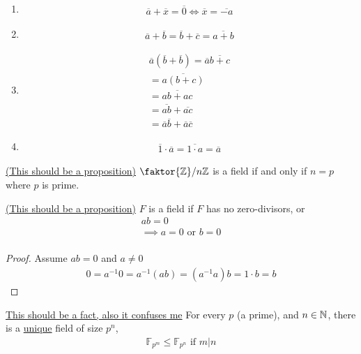 \documentclass[../notes.tex]{subfiles}
\begin{document}
\begin{definition}
\begin{enumerate}
        \item
            \vspace{.1cm}
            \begin{align*}
                \overline{a}+\overline{x}=\overline{0}
                \iff \overline{x}=\overline{-a}
            \end{align*}
        \item
            \vspace{.1cm}
            \begin{align*}
                \overline{a}+\overline{b}=\overline{b}+\overline{c}=\overline{a+b}
            \end{align*}
        \item
            \vspace{.1cm}
            \begin{align*}
                \overline{a}(\overline{b}+\overline{b})=
                \overline{a}\overline{b+c}\\
                =\overline{a(b+c)}\\
                =\overline{ab+ac}\\
                =\overline{ab}+\overline{ac}\\
                =\overline{a}\overline{b}+\overline{a}\overline{c}
            \end{align*}
        \item
            \vspace{.1cm}
            \begin{align*}
                \overline{1}\cdot\overline{a}=\overline{1\cdot a}=\overline{a}
            \end{align*}
    \end{enumerate}
\end{definition}
\begin{theorem}
    \underline{(This should be a proposition)}
    $\faktor{\Z}/{n\Z}$ is a field if and only if $n=p$ where
    $p$ is prime.
\end{theorem}
\begin{theorem}
    \underline{(This should be a proposition)}
    $F$ is a field if $F$ has no zero-divisors, or
    \begin{align*}
        ab=0\\
        \implies a=0 \text{ or } b=0\\
    \end{align*}
\end{theorem}
\begin{proof}
    Assume $ab=0$ and $a\neq0$
    \begin{align*}
        0=a^{-1}0=a^{-1}(ab)=(a^{-1}a)b=1\cdot b=b
    \end{align*}
\end{proof}
\begin{theorem}
    \underline{This should be a fact, also it confuses me}
    For every $p$ (a prime), and $n\in\mathbb{N}$, there is a \underline{unique}
    field of size $p^n$,
    \begin{align*}
        \mathbb{F}_{p^m}\le \mathbb{F}_{p^n} \text{ if } m|n
    \end{align*}
\end{theorem}
\end{document}
